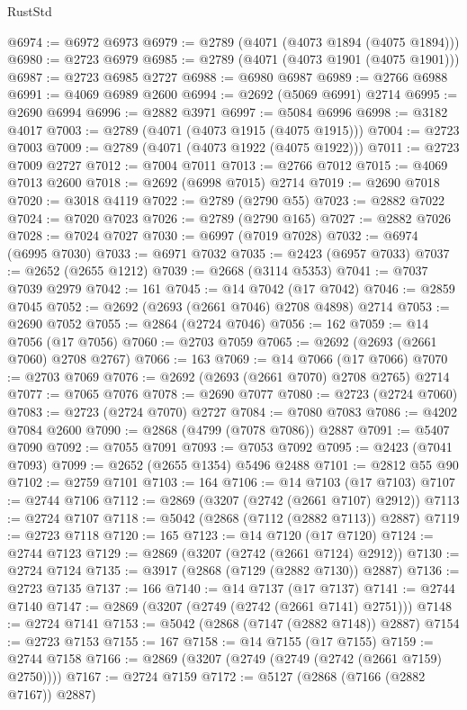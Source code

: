 \begin{lexlean}{RustStd}
\begin{coremodule}
@6974 := @6972 @6973
@6979 := @2789 (@4071 (@4073 @1894 (@4075 @1894)))
@6980 := @2723 @6979
@6985 := @2789 (@4071 (@4073 @1901 (@4075 @1901)))
@6987 := @2723 @6985 @2727
@6988 := @6980 @6987
@6989 := @2766 @6988
@6991 := @4069 @6989 @2600
@6994 := @2692 (@5069 @6991) @2714
@6995 := @2690 @6994
@6996 := @2882 @3971
@6997 := @5084 @6996
@6998 := @3182 @4017
@7003 := @2789 (@4071 (@4073 @1915 (@4075 @1915)))
@7004 := @2723 @7003
@7009 := @2789 (@4071 (@4073 @1922 (@4075 @1922)))
@7011 := @2723 @7009 @2727
@7012 := @7004 @7011
@7013 := @2766 @7012
@7015 := @4069 @7013 @2600
@7018 := @2692 (@6998 @7015) @2714
@7019 := @2690 @7018
@7020 := @3018 @4119
@7022 := @2789 (@2790 @55)
@7023 := @2882 @7022
@7024 := @7020 @7023
@7026 := @2789 (@2790 @165)
@7027 := @2882 @7026
@7028 := @7024 @7027
@7030 := @6997 (@7019 @7028)
@7032 := @6974 (@6995 @7030)
@7033 := @6971 @7032
@7035 := @2423 (@6957 @7033)
@7037 := @2652 (@2655 @1212)
@7039 := @2668 (@3114 @5353)
@7041 := @7037 @7039 @2979
@7042 := 161
@7045 := @14 @7042 (@17 @7042)
@7046 := @2859 @7045
@7052 := @2692 (@2693 (@2661 @7046) @2708 @4898) @2714
@7053 := @2690 @7052
@7055 := @2864 (@2724 @7046)
@7056 := 162
@7059 := @14 @7056 (@17 @7056)
@7060 := @2703 @7059
@7065 := @2692 (@2693 (@2661 @7060) @2708 @2767)
@7066 := 163
@7069 := @14 @7066 (@17 @7066)
@7070 := @2703 @7069
@7076 := @2692 (@2693 (@2661 @7070) @2708 @2765) @2714
@7077 := @7065 @7076
@7078 := @2690 @7077
@7080 := @2723 (@2724 @7060)
@7083 := @2723 (@2724 @7070) @2727
@7084 := @7080 @7083
@7086 := @4202 @7084 @2600
@7090 := @2868 (@4799 (@7078 @7086)) @2887
@7091 := @5407 @7090
@7092 := @7055 @7091
@7093 := @7053 @7092
@7095 := @2423 (@7041 @7093)
@7099 := @2652 (@2655 @1354) @5496 @2488
@7101 := @2812 @55 @90
@7102 := @2759 @7101
@7103 := 164
@7106 := @14 @7103 (@17 @7103)
@7107 := @2744 @7106
@7112 := @2869 (@3207 (@2742 (@2661 @7107) @2912))
@7113 := @2724 @7107
@7118 := @5042 (@2868 (@7112 (@2882 @7113)) @2887)
@7119 := @2723 @7118
@7120 := 165
@7123 := @14 @7120 (@17 @7120)
@7124 := @2744 @7123
@7129 := @2869 (@3207 (@2742 (@2661 @7124) @2912))
@7130 := @2724 @7124
@7135 := @3917 (@2868 (@7129 (@2882 @7130)) @2887)
@7136 := @2723 @7135
@7137 := 166
@7140 := @14 @7137 (@17 @7137)
@7141 := @2744 @7140
@7147 := @2869 (@3207 (@2749 (@2742 (@2661 @7141) @2751)))
@7148 := @2724 @7141
@7153 := @5042 (@2868 (@7147 (@2882 @7148)) @2887)
@7154 := @2723 @7153
@7155 := 167
@7158 := @14 @7155 (@17 @7155)
@7159 := @2744 @7158
@7166 := @2869 (@3207 (@2749 (@2749 (@2742 (@2661 @7159) @2750))))
@7167 := @2724 @7159
@7172 := @5127 (@2868 (@7166 (@2882 @7167)) @2887)

\end{coremodule}
\end{lexlean}

